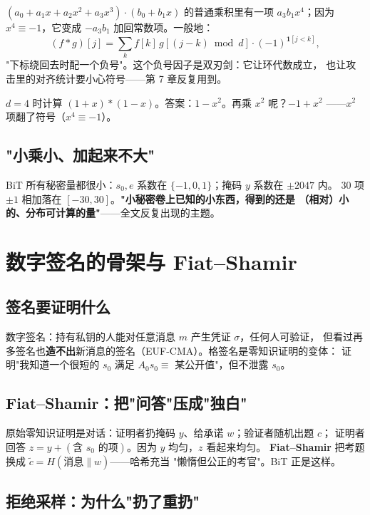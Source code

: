 \documentclass[11pt,a4paper]{ctexart}
\begin{document}
\begin{intuition}[小例子：$d=4$]
$(a_0 + a_1 x + a_2 x^2 + a_3 x^3)\cdot(b_0 + b_1 x)$ 的普通乘积里有一项
$a_3 b_1 x^4$；因为 $x^4 \equiv -1$，它变成 $-a_3b_1$ 加回常数项。一般地：
\[
  (f*g)[j] = \sum_{k} f[k]\, g[(j-k) \bmod d]\cdot (-1)^{\mathbf{1}[j<k]} ,
\]
"下标绕回去时配一个负号"。这个负号因子是双刃剑：它让环代数成立，
也让攻击里的对齐统计要小心符号——第 7 章反复用到。
\end{intuition}

\begin{checkpoint}
$d=4$ 时计算 $(1+x)*(1-x)$。答案：$1-x^2$。再乘 $x^2$ 呢？$-1+x^2$
——$x^2$ 项翻了符号（$x^4\equiv-1$）。
\end{checkpoint}

\subsection{"小乘小、加起来不大"}

BiT 所有秘密量都很小：$s_0, e$ 系数在 $\{-1,0,1\}$；掩码 $y$ 系数在 $\pm2047$ 内。
30 项 $\pm1$ 相加落在 $[-30,30]$。\textbf{"小秘密卷上已知的小东西，得到的还是
（相对）小的、分布可计算的量"}——全文反复出现的主题。

\section{数字签名的骨架与 Fiat--Shamir}

\subsection{签名要证明什么}

数字签名：持有私钥的人能对任意消息 $m$ 产生凭证 $\sigma$，任何人可验证，
但看过再多签名也\textbf{造不出}新消息的签名（EUF-CMA）。格签名是零知识证明的变体：
证明"我知道一个很短的 $s_0$ 满足 $A_0 s_0 \equiv$ 某公开值"，但不泄露 $s_0$。

\subsection{Fiat--Shamir：把"问答"压成"独白"}

原始零知识证明是对话：证明者扔掩码 $y$、给承诺 $w$；验证者随机出题 $c$；
证明者回答 $z = y + (\text{含 } s_0 \text{ 的项})$。因为 $y$ 均匀，$z$ 看起来均匀。
\textbf{Fiat--Shamir} 把考题换成 $\tilde c = H(\text{消息}\|w)$——哈希充当
"懒惰但公正的考官"。BiT 正是这样。

\subsection{拒绝采样：为什么"扔了重扔"}
\end{document}
